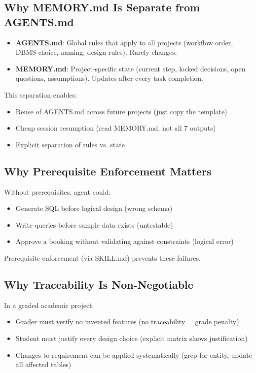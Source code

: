 \documentclass[12pt,a4paper]{article}
\begin{document}
\subsection{Why MEMORY.md Is Separate from AGENTS.md}

\begin{itemize}
    \item \textbf{AGENTS.md}: Global rules that apply to all projects (workflow order, DBMS choice, naming, design rules). Rarely changes.
    \item \textbf{MEMORY.md}: Project-specific state (current step, locked decisions, open questions, assumptions). Updates after every task completion.
\end{itemize}

This separation enables:
\begin{itemize}
    \item Reuse of AGENTS.md across future projects (just copy the template)
    \item Cheap session resumption (read MEMORY.md, not all 7 outputs)
    \item Explicit separation of rules vs. state
\end{itemize}

\subsection{Why Prerequisite Enforcement Matters}

Without prerequisites, agent could:
\begin{itemize}
    \item Generate SQL before logical design (wrong schema)
    \item Write queries before sample data exists (untestable)
    \item Approve a booking without validating against constraints (logical error)
\end{itemize}

Prerequisite enforcement (via SKILL.md) prevents these failures.

\subsection{Why Traceability Is Non-Negotiable}

In a graded academic project:
\begin{itemize}
    \item Grader must verify no invented features (no traceability = grade penalty)
    \item Student must justify every design choice (explicit matrix shows justification)
    \item Changes to requirement can be applied systematically (grep for entity, update all affected tables)
\end{itemize}
\end{document}
